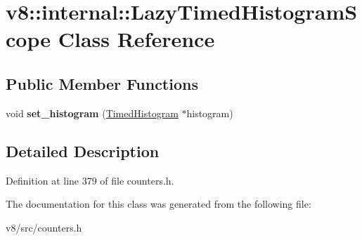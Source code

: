 \hypertarget{classv8_1_1internal_1_1LazyTimedHistogramScope}{}\section{v8\+:\+:internal\+:\+:Lazy\+Timed\+Histogram\+Scope Class Reference}
\label{classv8_1_1internal_1_1LazyTimedHistogramScope}
\subsection*{Public Member Functions}
\begin{DoxyCompactItemize}
\item 
\mbox{\label{classv8_1_1internal_1_1LazyTimedHistogramScope_a8bd4eeb57e8cdb9aff4d96d381b70b04}} 
void {\bfseries set\+\_\+histogram} (\mbox{\hyperlink{classv8_1_1internal_1_1TimedHistogram}{Timed\+Histogram}} $\ast$histogram)
\end{DoxyCompactItemize}


\subsection{Detailed Description}


Definition at line 379 of file counters.\+h.



The documentation for this class was generated from the following file\+:\begin{DoxyCompactItemize}
\item 
v8/src/counters.\+h\end{DoxyCompactItemize}
